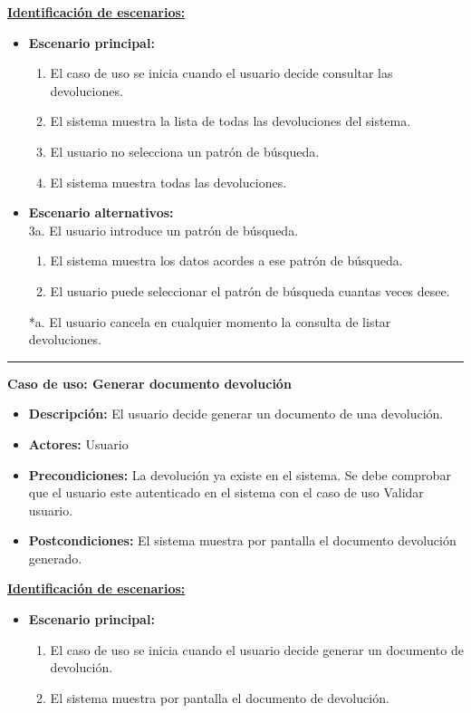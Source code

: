 \underline{\textbf{Identificación de escenarios:}}
\begin{itemize}\renewcommand{\labelitemi}{$\circ$}
 \item \textbf{Escenario principal:}
         \begin{enumerate}
          \item El caso de uso se inicia cuando el usuario decide consultar las devoluciones.
          \item El sistema muestra la lista de todas las devoluciones del sistema.
          \item El usuario no selecciona un patrón de búsqueda.
          \item El sistema muestra todas las devoluciones.
         \end{enumerate}
  \item \textbf{Escenario alternativos:}\\
  			3a. El usuario introduce un patrón de búsqueda.
  			\begin{enumerate}
  			\item El sistema muestra los datos acordes a ese patrón de búsqueda.
  			\item El usuario puede seleccionar el patrón de búsqueda cuantas veces desee.
  			\end{enumerate}
          *a. El usuario cancela en cualquier momento la consulta de listar devoluciones.
\end{itemize}
\smallskip
\hrule height 1pt
\smallskip
\textbf{Caso de uso: Generar documento devolución}
\begin{itemize}\renewcommand{\labelitemi}{$\cdot$}
 \item \textbf{Descripción:} El usuario decide generar un documento de una devolución.
  \item \textbf{Actores:} Usuario
  \item \textbf{Precondiciones:} La devolución ya existe en el sistema. Se debe comprobar que el usuario este autenticado en el sistema con el caso de uso Validar usuario.
  \item \textbf{Postcondiciones:} El sistema muestra por pantalla el documento devolución generado.
\end{itemize}
\underline{\textbf{Identificación de escenarios:}}
\begin{itemize}\renewcommand{\labelitemi}{$\circ$}
 \item \textbf{Escenario principal:}
         \begin{enumerate}
          \item El caso de uso se inicia cuando el usuario decide generar un documento de devolución.
	  \item El sistema muestra por pantalla el documento de devolución.
         \end{enumerate}
\end{itemize}

